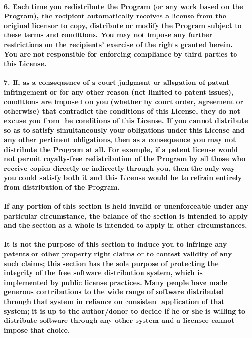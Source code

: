 \documentclass[english,letterpaper]{book}
\begin{document}
\paragraph{6. Each time you redistribute the Program (or any work based on the
Program), the recipient automatically receives a license from the
original licensor to copy, distribute or modify the Program subject
to these terms and conditions. You may not impose any further restrictions
on the recipients' exercise of the rights granted herein. You are
not responsible for enforcing compliance by third parties to this
License.}


\paragraph{7. If, as a consequence of a court judgment or allegation of patent
infringement or for any other reason (not limited to patent issues),
conditions are imposed on you (whether by court order, agreement or
otherwise) that contradict the conditions of this License, they do
not excuse you from the conditions of this License. If you cannot
distribute so as to satisfy simultaneously your obligations under
this License and any other pertinent obligations, then as a consequence
you may not distribute the Program at all. For example, if a patent
license would not permit royalty-free redistribution of the Program
by all those who receive copies directly or indirectly through you,
then the only way you could satisfy both it and this License would
be to refrain entirely from distribution of the Program.}


\paragraph{If any portion of this section is held invalid or unenforceable under
any particular circumstance, the balance of the section is intended
to apply and the section as a whole is intended to apply in other
circumstances.}


\paragraph{It is not the purpose of this section to induce you to infringe any
patents or other property right claims or to contest validity of any
such claims; this section has the sole purpose of protecting the integrity
of the free software distribution system, which is implemented by
public license practices. Many people have made generous contributions
to the wide range of software distributed through that system in reliance
on consistent application of that system; it is up to the author/donor
to decide if he or she is willing to distribute software through any
other system and a licensee cannot impose that choice.}
\end{document}
